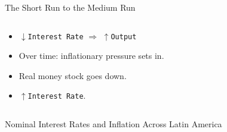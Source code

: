 \documentclass[shownotes,11pt, aspectratio=169]{beamer}
\begin{document}
\begin{frame}{The Short Run to the Medium Run}
\begin{columns}[T] %
\begin{column}{.36\textwidth}
\begin{itemize}
\item $\downarrow$\texttt{Interest Rate} $\Rightarrow$ $\uparrow$\texttt{Output}
\pause
\item Over time: inflationary pressure sets in. 
\pause
\item Real money stock goes down.
\pause
\item $\uparrow$\texttt{Interest Rate}.
\end{itemize}
\end{column}
\hfill
\pause
\begin{column}{.54\textwidth}
\end{column}
\end{columns}
\end{frame}

\begin{frame}{Nominal Interest Rates and Inflation Across Latin America}
\end{frame}
\end{document}
